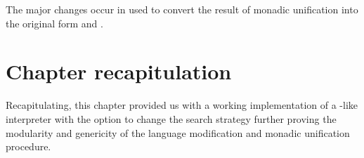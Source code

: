 \documentclass[thesis-solanki.tex]{files}
\begin{document}
The major changes occur in  used to convert the result of monadic unification into the original  form 
and .


\section{Chapter recapitulation}
Recapitulating, this chapter provided us with a working implementation of a -like interpreter with the option to change
the search strategy further proving the modularity and genericity of the language modification and monadic unification procedure.
\end{document}
